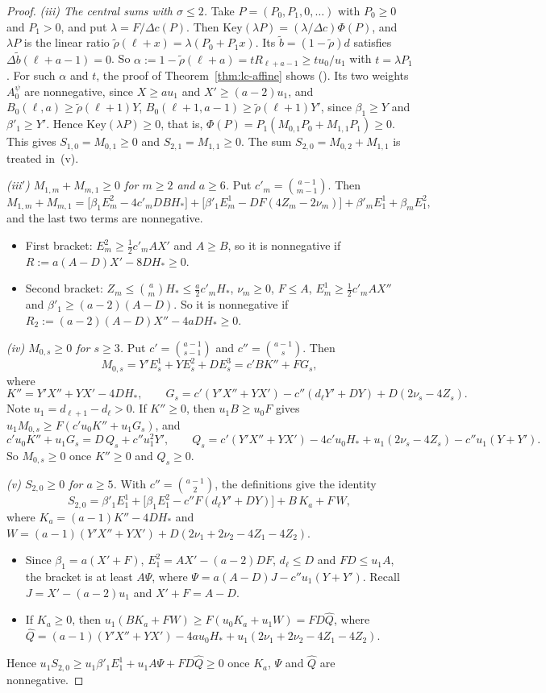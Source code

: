 \documentclass[twoside,10pt]{article}
\numberwithin{equation}{section}
\theoremstyle{slbody}
\theoremstyle{definition}
\theoremstyle{remark}
\renewcommand{\eqref}[1]{\textup{{\normalfont(\oldstylenums{\ref{#1}}}\normalfont)}}
\begin{document}
\begin{proof}
\emph{(iii) The central sums with $\sigma\leq2$.} Take $P=(P_0,P_1,0,\ldots)$ with $P_0\geq0$ and $P_1>0$, and put $\lambda=F/\Delta c(P)$. Then $\mathrm{Key}(\lambda P)=(\lambda/\Delta c)\Phi(P)$, and $\lambda P$ is the linear ratio $\tilde\rho(\ell+x)=\lambda(P_0+P_1x)$. Its $\tilde b=(1-\tilde\rho)d$ satisfies $\Delta\tilde b(\ell+a-1)=0$. So $\alpha:=1-\tilde\rho(\ell+a)=tR_{\ell+a-1}\geq tu_0/u_1$ with $t=\lambda P_1$. For such $\alpha$ and $t$, the proof of Theorem~\ref{thm:lc-affine} shows \eqref{eq:affine-red}. Its two weights $A^\psi_0$ are nonnegative, since $X\geq au_1$ and $X'\geq(a-2)u_1$, and $B_0(\ell,a)\geq\tilde\rho(\ell+1)Y$, $B_0(\ell+1,a-1)\geq\tilde\rho(\ell+1)Y'$, since $\beta_1\geq Y$ and $\beta'_1\geq Y'$. Hence $\mathrm{Key}(\lambda P)\geq0$, that is, $\Phi(P)=P_1(M_{0,1}P_0+M_{1,1}P_1)\geq0$. This gives $S_{1,0}=M_{0,1}\geq0$ and $S_{2,1}=M_{1,1}\geq0$. The sum $S_{2,0}=M_{0,2}+M_{1,1}$ is treated in~(v).

\emph{(iii$'$) $M_{1,m}+M_{m,1}\geq0$ for $m\geq2$ and $a\geq6$.} Put $c'_m=\binom{a-1}{m-1}$. Then
\[
M_{1,m}+M_{m,1}=\bigl[\beta_1E^2_m-4c'_mDBH_*\bigr]+\bigl[\beta'_1E^1_m-DF(4Z_m-2\nu_m)\bigr]+\beta'_mE^1_1+\beta_mE^2_1,
\]
and the last two terms are nonnegative.
\begin{itemize}
\item First bracket: $E^2_m\geq\frac12c'_mAX'$ and $A\geq B$, so it is nonnegative if $R:=a(A-D)X'-8DH_*\geq0$.
\item Second bracket: $Z_m\leq\binom amH_*\leq\frac a2c'_mH_*$, $\nu_m\geq0$, $F\leq A$, $E^1_m\geq\frac12c'_mAX''$ and $\beta'_1\geq(a-2)(A-D)$. So it is nonnegative if $R_2:=(a-2)(A-D)X''-4aDH_*\geq0$.
\end{itemize}

\emph{(iv) $M_{0,s}\geq0$ for $s\geq3$.} Put $c'=\binom{a-1}{s-1}$ and $c''=\binom{a-1}s$. Then
\[
M_{0,s}=Y'E^1_s+YE^2_s+DE^3_s=c'BK''+FG_s,
\]
where
\[
K''=Y'X''+YX'-4DH_*,\qquad G_s=c'(Y'X''+YX')-c''(d_\ell Y'+DY)+D(2\nu_s-4Z_s).
\]
Note $u_1=d_{\ell+1}-d_\ell>0$. If $K''\geq0$, then $u_1B\geq u_0F$ gives $u_1M_{0,s}\geq F(c'u_0K''+u_1G_s)$, and
\[
c'u_0K''+u_1G_s=D\,Q_s+c''u_1^2Y',\qquad Q_s=c'(Y'X''+YX')-4c'u_0H_*+u_1(2\nu_s-4Z_s)-c''u_1(Y+Y').
\]
So $M_{0,s}\geq0$ once $K''\geq0$ and $Q_s\geq0$.

\emph{(v) $S_{2,0}\geq0$ for $a\geq5$.} With $c''=\binom{a-1}2$, the definitions give the identity
\[
S_{2,0}=\beta'_1E^1_1+\bigl[\beta_1E^2_1-c''F(d_\ell Y'+DY)\bigr]+B\,K_a+F\,W,
\]
where $K_a=(a-1)K''-4DH_*$ and $W=(a-1)(Y'X''+YX')+D(2\nu_1+2\nu_2-4Z_1-4Z_2)$.
\begin{itemize}
\item Since $\beta_1=a(X'+F)$, $E^2_1=AX'-(a-2)DF$, $d_\ell\leq D$ and $FD\leq u_1A$, the bracket is at least $A\Psi$, where $\Psi=a(A-D)J-c''u_1(Y+Y')$. Recall $J=X'-(a-2)u_1$ and $X'+F=A-D$.
\item If $K_a\geq0$, then $u_1(BK_a+FW)\geq F(u_0K_a+u_1W)=FD\widehat Q$, where $\widehat Q=(a-1)(Y'X''+YX')-4au_0H_*+u_1(2\nu_1+2\nu_2-4Z_1-4Z_2)$.
\end{itemize}
Hence $u_1S_{2,0}\geq u_1\beta'_1E^1_1+u_1A\Psi+FD\widehat Q\geq0$ once $K_a$, $\Psi$ and $\widehat Q$ are nonnegative.


\end{proof}
\end{document}
